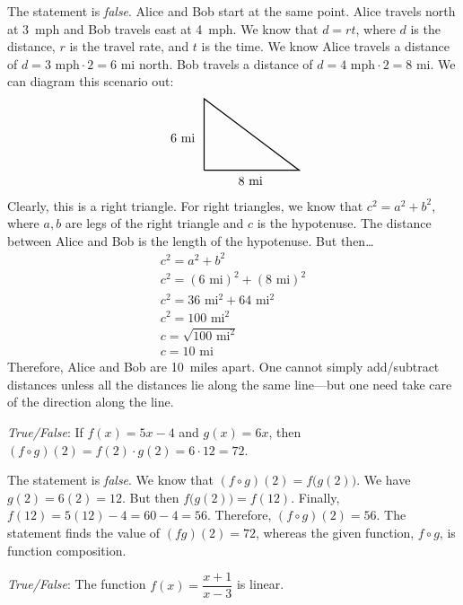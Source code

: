 \documentclass[11pt,letterpaper]{article}
\begin{document}
\sol The statement is \textit{false}. Alice and Bob start at the same point. Alice travels north at 3~mph and Bob travels east at 4~mph. We know that $d= rt$, where $d$ is the distance, $r$ is the travel rate, and $t$ is the time. We know Alice travels a distance of $d= 3 \text{ mph} \cdot 2= 6 \text{ mi}$ north. Bob travels a distance of $d= 4 \text{ mph} \cdot 2= 8 \text{ mi}$. We can diagram this scenario out:
	\[
	\begin{tikzpicture}
	\draw[line width=0.03cm] (0,0) -- (0,3/1.5) -- (4/1.5,0) -- (0,0);
	\node at (-0.6,0.9) {6~mi};
	\node at (1.3,-0.3) {8~mi};
	\end{tikzpicture}
	\]
Clearly, this is a right triangle. For right triangles, we know that $c^2= a^2 + b^2$, where $a, b$ are legs of the right triangle and $c$ is the hypotenuse. The distance between Alice and Bob is the length of the hypotenuse. But then\dots
	\[
	\begin{gathered}
	c^2= a^2 + b^2 \\
	c^2= (6 \text{ mi})^2 + (8 \text{ mi})^2 \\
	c^2= 36 \text{ mi}^2 + 64 \text{ mi}^2 \\
	c^2= 100 \text{ mi}^2 \\
	c= \sqrt{100 \text{ mi}^2} \\
	c= 10 \text{ mi}
	\end{gathered}
	\]
Therefore, Alice and Bob are 10~miles apart. One cannot simply add/subtract distances unless all the distances lie along the same line---but one need take care of the direction along the line. \pvspace{1.3cm}

 

\quizsol \textit{True/False}: If $f(x)= 5x - 4$ and $g(x)= 6x$, then $(f \circ g)(2)= f(2) \cdot g(2)= 6 \cdot 12= 72$. \pspace

\sol The statement is \textit{false}. We know that $(f \circ g)(2)= f \big( g(2) \big)$. We have $g(2)= 6(2)= 12$. But then $f \big( g(2) \big)= f(12)$. Finally, $f(12)= 5(12) - 4= 60 - 4= 56$. Therefore, $(f \circ g)(2)= 56$. The statement finds the value of $(fg)(2)= 72$, whereas the given function, $f \circ g$, is function composition. 

 

\newpage



\quizsol \textit{True/False}: The function $f(x)= \dfrac{x + 1}{x - 3}$ is linear. \pspace
\end{document}
